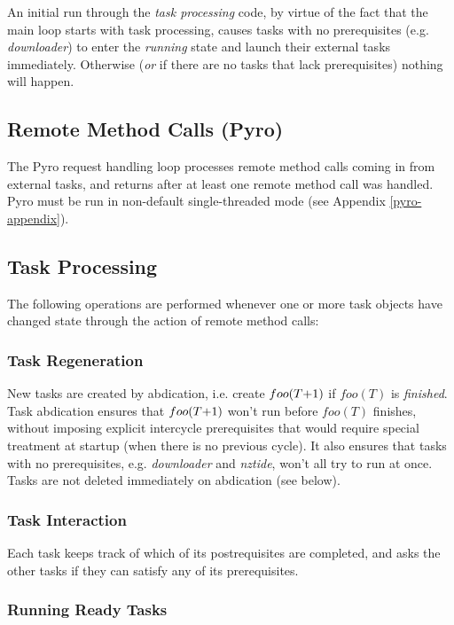 \documentclass[11pt,a4paper]{report}
\begin{document}
An initial run through the {\em task processing} code, by virtue of the
fact that the main loop starts with task processing, causes tasks with
no prerequisites (e.g. {\em downloader}) to enter the {\em running}
state and launch their external tasks immediately. Otherwise ({\em or}
if there are no tasks that lack prerequisites) nothing will happen.


\subsection{Remote Method Calls (Pyro)}

The Pyro request handling loop processes remote method calls coming in
from external tasks, and returns after at least one remote method call
was handled. Pyro must be run in non-default single-threaded mode (see
Appendix \ref{pyro-appendix}).


\subsection{Task Processing}

The following operations are performed whenever one or more task objects
have changed state through the action of remote method calls: 

\subsubsection{Task Regeneration}

New tasks are created by abdication, i.e. create $foo(T\negmedspace
+\negmedspace 1)$ if $foo(T)$ is {\em finished}.  Task abdication
ensures that $foo(T\negmedspace +\negmedspace 1)$ won't run before
$foo(T)$ finishes, without imposing explicit intercycle prerequisites
that would require special treatment at startup (when there is no
previous cycle).  It also ensures that tasks with no prerequisites, e.g.
{\em downloader} and {\em nztide}, won't all try to run at once.
Tasks are not deleted immediately on abdication (see below).


\subsubsection{Task Interaction} 

Each task keeps track of which of its postrequisites are completed, and
asks the other tasks if they can satisfy any of its prerequisites. 

\subsubsection{Running Ready Tasks}
\end{document}

